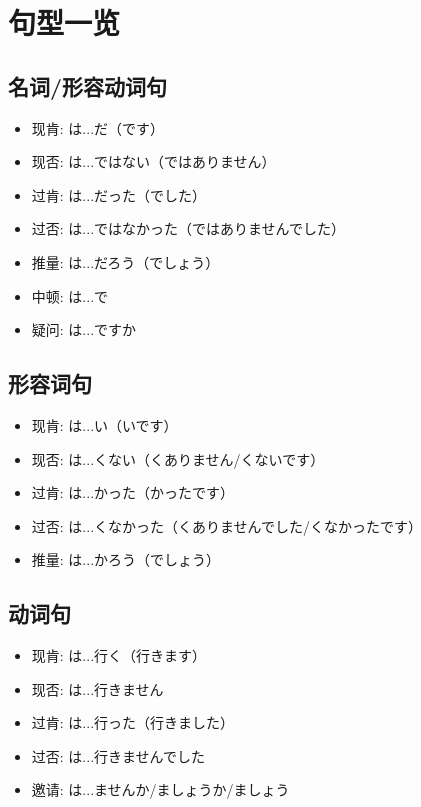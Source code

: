 
\usepackage{../../lectures_preamble}


    \section{句型一览}
        \subsection{名词/形容动词句}
        \begin{itemize}
            \item 现肯: は...だ（です）
            \item 现否: は...ではない（ではありません）
            \item 过肯: は...だった（でした）
            \item 过否: は...ではなかった（ではありませんでした）
            \item 推量: は...だろう（でしょう）
            \item 中顿: は...で
            \item 疑问: は...ですか
        \end{itemize}
        \subsection{形容词句}
        \begin{itemize}
            \item 现肯: は...い（いです）
            \item 现否: は...くない（くありません/くないです）
            \item 过肯: は...かった（かったです）
            \item 过否: は...くなかった（くありませんでした/くなかったです）
            \item 推量: は...かろう（でしょう）
        \end{itemize}
        \subsection{动词句}
        \begin{itemize}
            \item 现肯: は...行く（行きます） 
            \item 现否: は...行きません
            \item 过肯: は...行った（行きました）
            \item 过否: は...行きませんでした
            \item 邀请: は...ませんか/ましょうか/ましょう
        \end{itemize}
